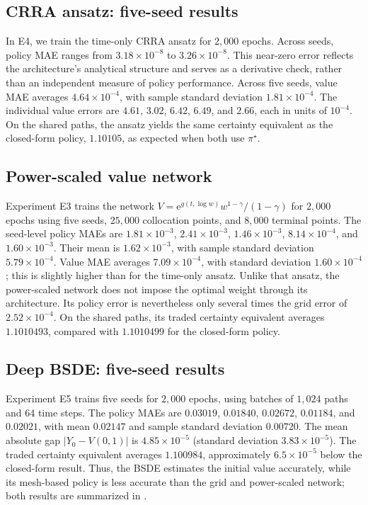 \documentclass[11pt,a4paper]{article}
\begin{document}
\subsection{CRRA ansatz: five-seed results}

In E4, we train the time-only CRRA ansatz for $2{,}000$ epochs. Across seeds, policy MAE ranges from $3.18\times 10^{-8}$ to $3.26\times 10^{-8}$. This near-zero error reflects the architecture's analytical structure and serves as a derivative check, rather than an independent measure of policy performance. Across five seeds, value MAE averages $4.64\times 10^{-4}$, with sample standard deviation $1.81\times 10^{-4}$. The individual value errors are $4.61$, $3.02$, $6.42$, $6.49$, and $2.66$, each in units of $10^{-4}$. On the shared paths, the ansatz yields the same certainty equivalent as the closed-form policy, $1.10105$, as expected when both use $\pi^{\star}$.

\subsection{Power-scaled value network}

Experiment E3 trains the network $V=\mathrm e^{g(t,\log w)}w^{1-\gamma}/(1-\gamma)$ for $2{,}000$ epochs using five seeds, $25{,}000$ collocation points, and $8{,}000$ terminal points. The seed-level policy MAEs are $1.81\times 10^{-3}$, $2.41\times 10^{-3}$, $1.46\times 10^{-3}$, $8.14\times 10^{-4}$, and $1.60\times 10^{-3}$. Their mean is $1.62\times 10^{-3}$, with sample standard deviation $5.79\times 10^{-4}$. Value MAE averages $7.09\times 10^{-4}$, with standard deviation $1.60\times 10^{-4}$; this is slightly higher than for the time-only ansatz. Unlike that ansatz, the power-scaled network does not impose the optimal weight through its architecture. Its policy error is nevertheless only several times the grid error of $2.52\times 10^{-4}$. On the shared paths, its traded certainty equivalent averages $1.1010493$, compared with $1.1010499$ for the closed-form policy.

\subsection{Deep BSDE: five-seed results}

Experiment E5 trains five seeds for $2{,}000$ epochs, using batches of $1{,}024$ paths and 64 time steps. The policy MAEs are $0.03019$, $0.01840$, $0.02672$, $0.01184$, and $0.02021$, with mean $0.02147$ and sample standard deviation $0.00720$. The mean absolute gap $|Y_0-V(0,1)|$ is $4.85\times 10^{-5}$ (standard deviation $3.83\times 10^{-5}$). The traded certainty equivalent averages $1.100984$, approximately $6.5\times 10^{-5}$ below the closed-form result. Thus, the BSDE estimates the initial value accurately, while its mesh-based policy is less accurate than the grid and power-scaled network; both results are summarized in .
\end{document}
